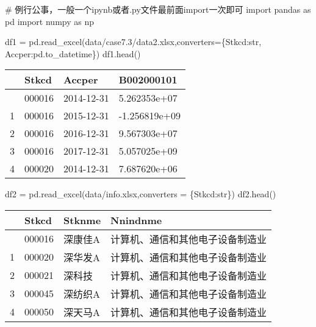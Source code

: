 \documentclass[
  letterpaper,
  DIV=11,
  numbers=noendperiod]{scrreprt}
\newenvironment{Shaded}{\begin{snugshade}}{\end{snugshade}}
\newcommand{\BuiltInTok}[1]{\textcolor[rgb]{0.00,0.23,0.31}{#1}}
\newcommand{\CommentTok}[1]{\textcolor[rgb]{0.37,0.37,0.37}{#1}}
\newcommand{\ImportTok}[1]{\textcolor[rgb]{0.00,0.46,0.62}{#1}}
\newcommand{\NormalTok}[1]{\textcolor[rgb]{0.00,0.23,0.31}{#1}}
\newcommand{\OperatorTok}[1]{\textcolor[rgb]{0.37,0.37,0.37}{#1}}
\newcommand{\StringTok}[1]{\textcolor[rgb]{0.13,0.47,0.30}{#1}}
\begin{document}
\begin{Shaded}
\begin{Highlighting}[]
\CommentTok{\# 例行公事，一般一个ipynb或者.py文件最前面import一次即可}
\ImportTok{import}\NormalTok{ pandas }\ImportTok{as}\NormalTok{ pd}
\ImportTok{import}\NormalTok{ numpy }\ImportTok{as}\NormalTok{ np}

\NormalTok{df1 }\OperatorTok{=}\NormalTok{ pd.read\_excel(}\StringTok{\textquotesingle{}data/case7.3/data2.xlsx\textquotesingle{}}\NormalTok{,converters}\OperatorTok{=}\NormalTok{\{}\StringTok{\textquotesingle{}Stkcd\textquotesingle{}}\NormalTok{:}\BuiltInTok{str}\NormalTok{, }\StringTok{\textquotesingle{}Accper\textquotesingle{}}\NormalTok{:pd.to\_datetime\})}
\NormalTok{df1.head()}
\end{Highlighting}
\end{Shaded}

\begin{longtable}[]{@{}llll@{}}
\toprule\noalign{}
& Stkcd & Accper & B002000101 \\
\midrule\noalign{}
\endhead
\bottomrule\noalign{}
\endlastfoot
0 & 000016 & 2014-12-31 & 5.262353e+07 \\
1 & 000016 & 2015-12-31 & -1.256819e+09 \\
2 & 000016 & 2016-12-31 & 9.567303e+07 \\
3 & 000016 & 2017-12-31 & 5.057025e+09 \\
4 & 000020 & 2014-12-31 & 7.687620e+06 \\
\end{longtable}

\begin{Shaded}
\begin{Highlighting}[]
\NormalTok{df2 }\OperatorTok{=}\NormalTok{ pd.read\_excel(}\StringTok{\textquotesingle{}data/info.xlsx\textquotesingle{}}\NormalTok{,converters }\OperatorTok{=}\NormalTok{ \{}\StringTok{\textquotesingle{}Stkcd\textquotesingle{}}\NormalTok{:}\BuiltInTok{str}\NormalTok{\})}
\NormalTok{df2.head()}
\end{Highlighting}
\end{Shaded}

\begin{longtable}[]{@{}llll@{}}
\toprule\noalign{}
& Stkcd & Stknme & Nnindnme \\
\midrule\noalign{}
\endhead
\bottomrule\noalign{}
\endlastfoot
0 & 000016 & 深康佳A & 计算机、通信和其他电子设备制造业 \\
1 & 000020 & 深华发A & 计算机、通信和其他电子设备制造业 \\
2 & 000021 & 深科技 & 计算机、通信和其他电子设备制造业 \\
3 & 000045 & 深纺织A & 计算机、通信和其他电子设备制造业 \\
4 & 000050 & 深天马A & 计算机、通信和其他电子设备制造业 \\
\end{longtable}
\end{document}
